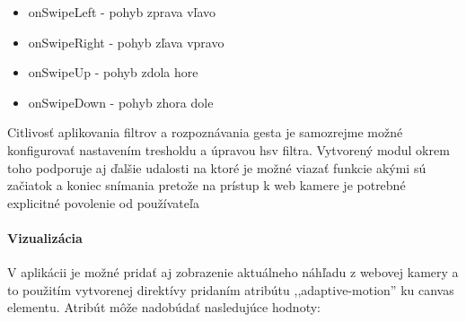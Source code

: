\begin{itemize}
  \item onSwipeLeft - pohyb zprava vľavo
  \item onSwipeRight - pohyb zľava vpravo
  \item onSwipeUp - pohyb zdola hore
  \item onSwipeDown - pohyb zhora dole 
\end{itemize}

Citlivosť aplikovania filtrov a rozpoznávania gesta je samozrejme možné konfigurovať nastavením tresholdu a úpravou hsv filtra. Vytvorený modul okrem toho podporuje aj ďalšie udalosti na ktoré je možné viazať funkcie akými sú začiatok a koniec snímania pretože na prístup k web kamere je potrebné explicitné povolenie od používateľa

\paragraph{Vizualizácia} %
\label{par:zobrazenie_n_h_adu}

V aplikácii je možné pridať aj zobrazenie aktuálneho náhľadu z webovej kamery a to použitím vytvorenej direktívy pridaním atribútu ,,adaptive-motion'' ku canvas elementu. Atribút môže nadobúdať nasledujúce hodnoty:


